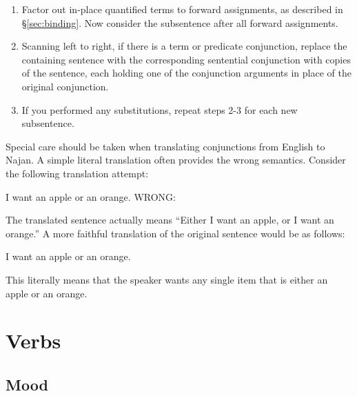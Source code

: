 \begin{enumerate}
	\item Factor out in-place quantified terms to forward assignments, as
	      described in \S\ref{sec:binding}. Now consider the subsentence after
	      all forward assignments.
	\item Scanning left to right, if there is a term or predicate conjunction,
	      replace the containing sentence with the corresponding sentential
	      conjunction with copies of the sentence, each holding one of the conjunction
	      arguments in place of the original conjunction.
	\item If you performed any substitutions, repeat steps 2-3 for each new
	      subsentence.
\end{enumerate}


Special care should be taken when translating conjunctions from English to
Najan. A simple literal translation often provides the wrong semantics. Consider
the following translation attempt:

{I want an apple or an orange.}
{WRONG: }

The translated sentence actually means ``Either I want an apple, or I want an
orange.'' A more faithful translation of the original sentence would be as
follows:

{I want an apple or an orange.}
{}

This literally means that the speaker wants any single item that is either an
apple or an orange.

\section{Verbs} \label{sec:verbs}

\subsection{Mood} \label{sec:mood}

